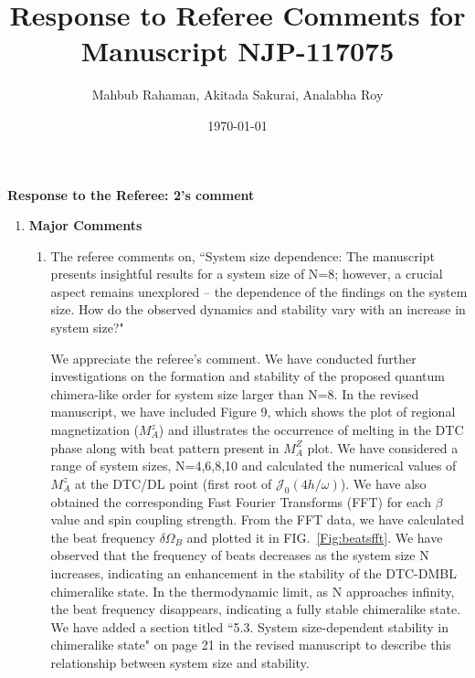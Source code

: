\documentclass[aps,prb,reprint,showpacs,floatfix,superscriptaddress, onecolumn, nofootinbib, 10pt]{revtex4-2}
\newcommand{\response}[1]{{\color{black}#1}} %
\newcommand{\comment}[1]{{\color{blue}#1}} %
\newcommand{\figref}[1]{FIG.~\ref{#1}}
\begin{document}

\title{Response to Referee Comments for Manuscript NJP-117075}
\author{Mahbub Rahaman, Akitada Sakurai, Analabha Roy}
\date{\today}

\maketitle

\vspace{1em}

\noindent \textbf{Response to the Referee: 2's comment}
\begin{enumerate}
	\item {\bf Major Comments}
	\begin{enumerate}
		\item The referee comments on, \comment{``System size dependence: The manuscript presents insightful results for a system size
				of N=8; however, a crucial aspect remains unexplored – the dependence of the
				findings on the system size. How do the observed dynamics and stability vary with an
				increase in system size?"}\\
		
		\response{
			We appreciate the referee's comment. We have conducted further investigations on the formation and stability of the proposed quantum chimera-like order for system size larger than N=8. In the revised manuscript, we have included Figure 9, which shows the plot of regional magnetization ($M^z_A$) and illustrates the occurrence of melting in the DTC phase along with beat pattern present in $M^Z_A$ plot. We have considered a range of system sizes, N=4,6,8,10 and calculated the numerical values of $M^z_A$ at the DTC/DL point (first root of $\mathcal{J}_0(4h/\omega)$). We have also obtained the corresponding Fast Fourier Transforms (FFT) for each $\beta$ value and spin coupling strength. From the FFT data, we have calculated the beat frequency $\delta \Omega_B$ \cite{Liu2023,CHANDRA2024129552}  and plotted it in \figref{Fig:beatsfft}. We have observed that the frequency of beats decreases as the system size N increases, indicating an enhancement in the stability of the DTC-DMBL chimeralike state. In the thermodynamic limit, as N approaches infinity, the beat frequency disappears, indicating a fully stable chimeralike state. We have added a section titled ``5.3. System size-dependent stability in chimeralike state" on page 21 in the revised manuscript to describe this relationship between system size and stability.


}
\end{enumerate}
\end{enumerate}
\end{document}
